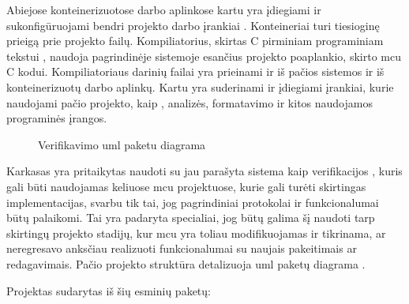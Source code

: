 Abiejose konteinerizuotose darbo aplinkose kartu yra įdiegiami ir sukonfigūruojami bendri projekto darbo įrankiai \lent{\ref{tab:docker_dependencies}}. Konteineriai turi tiesioginę prieigą prie projekto failų. Kompiliatorius, skirtas C pirminiam programiniam tekstui , naudoja pagrindinėje sistemoje esančius projekto poaplankio, skirto \gls{mcu} C kodui. Kompiliatoriaus darinių failai yra prieinami ir iš pačios sistemos ir iš konteinerizuotų darbo aplinkų. Kartu yra suderinami ir įdiegiami įrankiai, kurie naudojami pačio projekto, kaip , analizės, formatavimo ir kitos naudojamos programinės įrangos.

\begin{figure}[H]
	
	\caption{Verifikavimo  \gls{uml} paketu diagrama}
	\label{fig:uml_package}
\end{figure}

Karkasas yra pritaikytas naudoti su jau parašyta sistema kaip verifikacijos , kuris gali būti naudojamas keliuose \gls{mcu} projektuose, kurie gali turėti skirtingas implementacijas, svarbu tik tai, jog pagrindiniai protokolai ir funkcionalumai būtų palaikomi. Tai yra padaryta specialiai, jog būtų galima šį  naudoti tarp skirtingų projekto stadijų, kur \gls{mcu} yra toliau modifikuojamas ir tikrinama, ar neregresavo anksčiau realizuoti funkcionalumai su naujais pakeitimais ar redagavimais. Pačio projekto struktūra detalizuoja \gls{uml} paketų diagrama \pav{\ref{fig:uml_package}}.

Projektas sudarytas iš šių esminių paketų:

